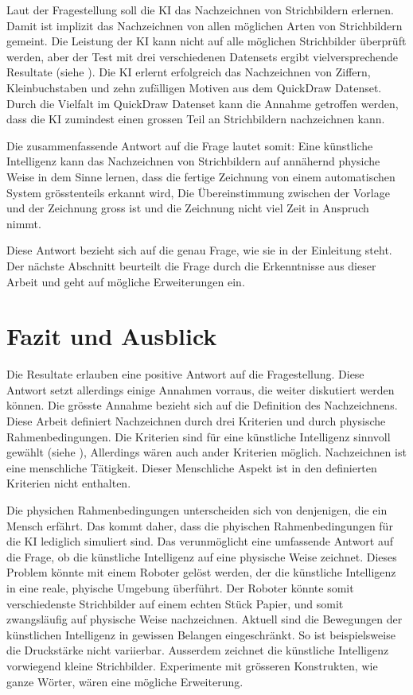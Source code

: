 Laut der Fragestellung soll die KI das Nachzeichnen von Strichbildern erlernen.
Damit ist implizit das Nachzeichnen von allen möglichen Arten von Strichbildern
gemeint. Die Leistung der KI kann nicht auf alle möglichen Strichbilder
überprüft werden, aber der Test mit drei verschiedenen Datensets ergibt
vielversprechende Resultate (siehe ). Die KI erlernt
erfolgreich das Nachzeichnen von Ziffern, Kleinbuchstaben und zehn zufälligen
Motiven aus dem QuickDraw Datenset. Durch die Vielfalt im QuickDraw Datenset
kann die Annahme getroffen werden, dass die KI zumindest einen grossen Teil an
Strichbildern nachzeichnen kann. 

Die zusammenfassende Antwort auf die Frage lautet somit: Eine künstliche
Intelligenz kann das Nachzeichnen von Strichbildern auf annähernd physiche Weise
in dem Sinne lernen, dass die fertige Zeichnung von einem automatischen System
grösstenteils erkannt wird, Die Übereinstimmung zwischen der Vorlage und der
Zeichnung gross ist und die Zeichnung nicht viel Zeit in Anspruch nimmt.

Diese Antwort bezieht sich auf die genau Frage, wie sie in der Einleitung steht.
Der nächste Abschnitt beurteilt die Frage durch die Erkenntnisse aus dieser
Arbeit und geht auf mögliche Erweiterungen ein.


\section{Fazit und Ausblick}
\label{chap:d_faz-aus}
Die Resultate erlauben eine positive Antwort auf die Fragestellung. Diese
Antwort setzt allerdings einige Annahmen vorraus, die weiter diskutiert werden
können. Die grösste Annahme bezieht sich auf die Definition des Nachzeichnens.
Diese Arbeit definiert Nachzeichnen durch drei Kriterien und durch physische
Rahmenbedingungen. Die Kriterien sind für eine künstliche Intelligenz sinnvoll
gewählt (siehe ), Allerdings wären auch ander
Kriterien möglich. Nachzeichnen ist eine menschliche Tätigkeit. Dieser
Menschliche Aspekt ist in den definierten Kriterien nicht enthalten.

Die physichen Rahmenbedingungen unterscheiden sich von denjenigen, die ein
Mensch erfährt. Das kommt daher, dass die phyischen Rahmenbedingungen für die KI
lediglich simuliert sind. Das verunmöglicht eine umfassende Antwort auf die
Frage, ob die künstliche Intelligenz auf eine physische Weise zeichnet. Dieses
Problem könnte mit einem Roboter gelöst werden, der die künstliche Intelligenz
in eine reale, phyische Umgebung überführt. Der Roboter könnte somit
verschiedenste Strichbilder auf einem echten Stück Papier, und somit
zwangsläufig auf physische Weise nachzeichnen. Aktuell sind die Bewegungen der
künstlichen Intelligenz in gewissen Belangen eingeschränkt. So ist
beispielsweise die Druckstärke nicht variierbar. Ausserdem zeichnet die
künstliche Intelligenz vorwiegend kleine Strichbilder. Experimente mit grösseren
Konstrukten, wie ganze Wörter, wären eine mögliche Erweiterung. 

